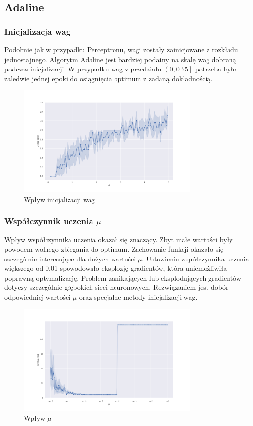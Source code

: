\documentclass{article}
\begin{document}
\FloatBarrier
\subsection {Adaline}

\subsubsection{Inicjalizacja wag}
Podobnie jak w przypadku Perceptronu, wagi zostały zainicjowane z rozkładu jednostajnego.
Algorytm Adaline jest bardziej podatny na skalę wag dobraną podczas inicjalizacji.
W przypadku wag z przedziału $\left(0, 0.25\right]$ potrzeba było zaledwie jednej
epoki do osiągnięcia optimum z zadaną dokładnością.

\begin{figure}[h]
  \caption{Wpływ inicjalizacji wag}
  \centering
    \includegraphics[width=0.8\textwidth]{images/06_ada_interval.png}
\end{figure}

\FloatBarrier
\subsubsection{Współczynnik uczenia $\mu$}
Wpływ współczynnika uczenia okazał się znaczący.
Zbyt małe wartości były powodem wolnego zbiegania do optimum.
Zachowanie funkcji okazało się szczególnie interesujące dla dużych wartości $\mu$.
Ustawienie współczynnika uczenia większego od 0.01 spowodowało eksplozję gradientów, która uniemożliwiła poprawną optymalizację.
Problem zanikających lub eksplodujących gradientów dotyczy szczególnie głębokich sieci neuronowych.
Rozwiązaniem jest dobór odpowiedniej wartości $\mu$ oraz specjalne metody inicjalizacji wag.


\begin{figure}[h]
  \caption{Wpływ $\mu$}
  \centering
    \includegraphics[width=0.8\textwidth]{images/07_ada_lr.png}
\end{figure}
\FloatBarrier
\end{document}

